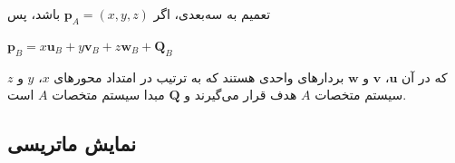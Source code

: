 {\begin{spacing}{1.4}
        تعمیم به سه‌بعدی، اگر $\textbf{p}_{A}=(x, y, z)$ باشد، پس

        \begin{center}
            $\textbf{p}_{B}=x\textbf{u}_{B}+y\textbf{v}_{B}+z\textbf{w}_{B}+\textbf{Q}_{B}$
        \end{center}

        که در آن $\textbf{u}$، $\textbf{v}$ و $\textbf{w}$ بردارهای واحدی هستند که به ترتیب در امتداد محورهای $x$، $y$ و $z$ سیستم متخصات $A$ هدف قرار می‌گیرند و $\textbf{Q}$ مبدا سیستم متخصات $A$ است.
    \end{spacing}
}

\subsection{\textbf{نمایش ماتریسی}}
\label{subsec:3.4.3}
